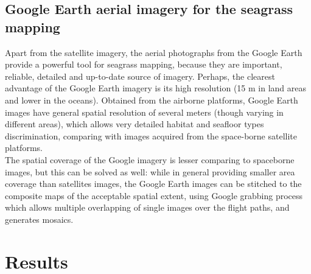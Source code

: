 \documentclass[10pt, a4paper]{article}
\begin{document}
\subsection[Google Earth aerial imagery]{Google Earth aerial imagery for the seagrass mapping}
Apart from the satellite imagery, the aerial photographs from the Google Earth provide
a powerful tool for seagrass mapping, because they are important, reliable, detailed
and up-to-date source of imagery.
Perhaps, the clearest advantage of the Google
Earth imagery is its high resolution (15 m in land areas and lower in the oceans).
Obtained from the airborne platforms, Google Earth images have general spatial
resolution of several meters (though varying in different areas), which allows very
detailed habitat and seafloor types discrimination, comparing with images
acquired from the space-borne satellite platforms.\\
The spatial coverage of the Google imagery is lesser comparing to spaceborne images, but this can be solved as
well: while in general providing smaller area coverage than satellites images, the Google Earth
images can be stitched to the composite maps of the acceptable spatial extent, using Google grabbing
process which allows multiple overlapping of single images over the flight paths, and generates
mosaics.

\section{Results}\label{sec:4}
\end{document}
